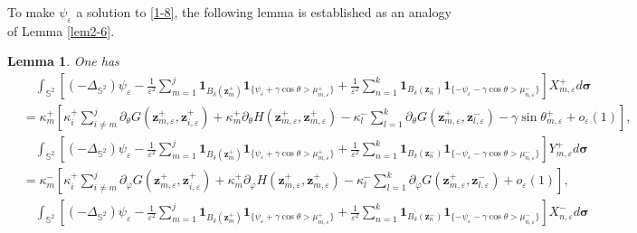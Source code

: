 \documentclass[12pt,reqno]{amsart}
\numberwithin{equation}{section}
\newtheorem{lemma}[theorem]{Lemma}
\theoremstyle{definition}
\theoremstyle{remark}
\begin{document}
	To make $\psi_\varepsilon$ a solution to \eqref{1-8}, the following lemma is established as an analogy of Lemma \ref{lem2-6}.
	\begin{lemma}\label{lem3-2}
		One has
		\begin{align*}
			&\quad\int_{\mathbb S^2}\left[(-\Delta_{\mathbb S^2})\psi_\varepsilon-\frac{1}{\varepsilon^2}\sum_{m=1}^j\boldsymbol1_{B_\delta(\boldsymbol z_m^+)}\boldsymbol1_{\{\psi_\varepsilon+\gamma\cos\theta>\mu_{m,\varepsilon}^+\}}+\frac{1}{\varepsilon^2}\sum_{n=1}^k\boldsymbol1_{B_\delta(\boldsymbol z_n^-)}\boldsymbol1_{\{-\psi_\varepsilon-\gamma\cos\theta>\mu_{n,\varepsilon}^-\}}\right]X_{m,\varepsilon}^+ d\boldsymbol\sigma\\
			&=\kappa_m^+\left[\kappa_i^+\sum\limits_{i\neq m}^j\partial_\theta G(\boldsymbol z_{m,\varepsilon}^+,\boldsymbol z_{i,\varepsilon}^+)+ \kappa_m^+ \partial_\theta H(\boldsymbol z_{m,\varepsilon}^+,\boldsymbol z_{m,\varepsilon}^+)-\kappa_l^-\sum\limits_{l=1}^k\partial_\theta G(\boldsymbol z_{m,\varepsilon}^+,\boldsymbol z_{l,\varepsilon}^-)-\gamma\sin\theta_{m,\varepsilon}^++o_\varepsilon(1)\right],
		\end{align*}
		\begin{align*}
			&\quad\int_{\mathbb S^2}\left[(-\Delta_{\mathbb S^2})\psi_\varepsilon-\frac{1}{\varepsilon^2}\sum_{m=1}^j\boldsymbol1_{B_\delta(\boldsymbol z_m^+)}\boldsymbol1_{\{\psi_\varepsilon+\gamma\cos\theta>\mu_{m,\varepsilon}^+\}}+\frac{1}{\varepsilon^2}\sum_{n=1}^k\boldsymbol1_{B_\delta(\boldsymbol z_n^-)}\boldsymbol1_{\{-\psi_\varepsilon-\gamma\cos\theta>\mu_{n,\varepsilon}^-\}}\right]Y_{m,\varepsilon}^+ d\boldsymbol\sigma\\
			&=\kappa_m^-\left[\kappa_i^+\sum\limits_{i\neq m}^j\partial_\varphi G(\boldsymbol z_{m,\varepsilon}^+,\boldsymbol z_{i,\varepsilon}^+)+ \kappa_m^+ \partial_\varphi H(\boldsymbol z_{m,\varepsilon}^+,\boldsymbol z_{m,\varepsilon}^+)-\kappa_l^-\sum\limits_{l=1}^k\partial_\varphi G(\boldsymbol z_{m,\varepsilon}^+,\boldsymbol z_{l,\varepsilon}^-)+o_\varepsilon(1)\right],
		\end{align*}
		\begin{align*}
			&\quad\int_{\mathbb S^2}\left[(-\Delta_{\mathbb S^2})\psi_\varepsilon-\frac{1}{\varepsilon^2}\sum_{m=1}^j\boldsymbol1_{B_\delta(\boldsymbol z_m^+)}\boldsymbol1_{\{\psi_\varepsilon+\gamma\cos\theta>\mu_{m,\varepsilon}^+\}}+\frac{1}{\varepsilon^2}\sum_{n=1}^k\boldsymbol1_{B_\delta(\boldsymbol z_n^-)}\boldsymbol1_{\{-\psi_\varepsilon-\gamma\cos\theta>\mu_{n,\varepsilon}^-\}}\right]X_{n,\varepsilon}^- d\boldsymbol\sigma\\

\end{align*}
\end{lemma}
\end{document}
